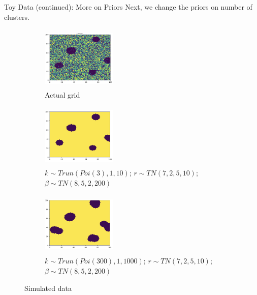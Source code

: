 \documentclass[10pt,mathserif]{beamer}
\begin{document}
\begin{frame}{Toy Data (continued): More on Priors}
Next, we change the priors on number of clusters.
\begin{figure}[t!]
    \centering
    \begin{subfigure}[t]{0.3\textwidth}
        \centering
        \includegraphics[height=1.2in, width=1.4in]{../BDC_gridactual}
        \caption{Actual grid}
    \end{subfigure}%
    \begin{subfigure}[t]{0.3\textwidth}
        \centering
        \includegraphics[height=1.2in, width=1.4in]{../BDC_grid7_c3}
        \caption{ $k \sim Trun(Poi(3), 1, 10)$; $r \sim TN(7, 2, 5, 10)$; $\beta \sim TN(8, 5, 2, 200)$}
    \end{subfigure}%
        \begin{subfigure}[t]{0.3\textwidth}
        \centering
        \includegraphics[height=1.2in, width=1.4in]{../BDC_grid8_c300}
        \caption{ $k \sim Trun(Poi(300), 1, 1000)$; $r \sim TN(7, 2, 5, 10)$; $\beta \sim TN(8, 5, 2, 200)$}
    \end{subfigure}
    \caption{Simulated data}
\end{figure}
\end{frame}
\end{document}
